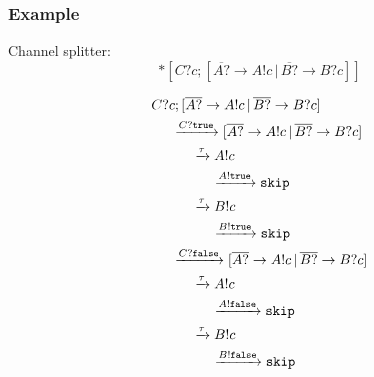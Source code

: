 \documentclass[compress]{beamer}
\begin{document}
\begin{frame}
    \frametitle{Example}
    Channel splitter:
    {\small $$*[C?c; [\overline{A?} \rightarrow A!c \, | \, \overline{B?} \rightarrow B?c]]$$}
\end{frame}
\begin{frame}
    \small
    \begin{align*}
        & C?c; [\overline{A?} \rightarrow A!c \, | \, \overline{B?} \rightarrow B?c] \\
        & \hspace{0.5cm} \xrightarrow{C?\mathtt{true}} [\overline{A?} \rightarrow A!c \, | \, \overline{B?} \rightarrow B?c] \\
        & \hspace{1.0cm} \xrightarrow{\tau} A!c \\
        & \hspace{1.5cm} \xrightarrow{A!\mathtt{true}} \mathtt{skip} \\
        & \hspace{1.0cm} \xrightarrow{\tau} B!c \\
        & \hspace{1.5cm} \xrightarrow{B!\mathtt{true}} \mathtt{skip} \\
        & \hspace{0.5cm} \xrightarrow{C?\mathtt{false}} [\overline{A?} \rightarrow A!c \, | \, \overline{B?} \rightarrow B?c] \\
        & \hspace{1.0cm} \xrightarrow{\tau} A!c \\
        & \hspace{1.5cm} \xrightarrow{A!\mathtt{false}} \mathtt{skip} \\
        & \hspace{1.0cm} \xrightarrow{\tau} B!c \\
        & \hspace{1.5cm} \xrightarrow{B!\mathtt{false}} \mathtt{skip}
    \end{align*}
\end{frame}
\end{document}
